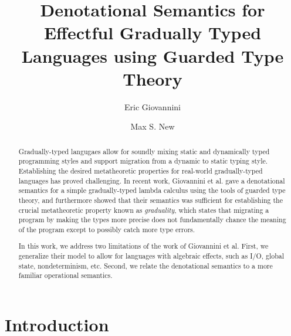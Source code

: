 \documentclass[acmsmall, screen]{acmart}
\theoremstyle{remark}
\begin{document}
\title{Denotational Semantics for Effectful Gradually Typed Languages using Guarded Type Theory}
\author{Eric Giovannini}


\author{Max S. New}

\begin{abstract}
    Gradually-typed langugaes allow for soundly mixing static and dynamically
    typed programming styles and support migration from a dynamic to static
    typing style. Establishing the desired metatheoretic properties for
    real-world gradually-typed languages has proved challenging.
    In recent work, Giovannini et al. gave a denotational semantics for a simple
    gradually-typed lambda calculus using the tools of guarded type theory, and
    furthermore showed that their semantics was sufficient for establishing the
    crucial metatheoretic property known as \emph{graduality}, which states that
    migrating a program by making the types more precise does not fundamentally
    chance the meaning of the program except to possibly catch more type errors.
    
    In this work, we address two limitations of the work of Giovannini et al.
    First, we generalize their model to allow for languages with algebraic
    effects, such as I/O, global state, nondeterminism, etc. Second, we relate
    the denotational semantics to a more familiar operational semantics.
\end{abstract}

\maketitle

\newif\ifdraft
\drafttrue
\renewcommand{\max}[1]{\ifdraft{\color{blue}[{\bf Max}: #1]}\fi}
\newcommand{\eric}[1]{\ifdraft{\color{orange}[{\bf Eric}: #1]}\fi}
\newcommand{\tingting}[1]{\ifdraft{\color{red}[{\bf Tingting}: #1]}\fi}


\section{Introduction}
\end{document}
